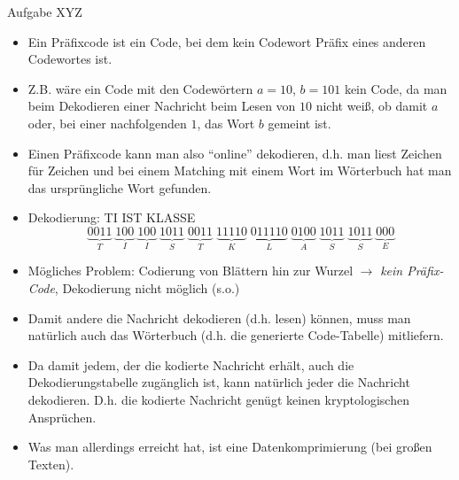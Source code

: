 \begin{frame}[allowframebreaks]{Aufgabe \thesection}{XYZ}
  \begin{Sidenote}
    \begin{itemize}
      \item Ein Präfixcode ist ein Code, bei dem kein Codewort Präfix eines anderen Codewortes ist. 
      \item Z.B. wäre ein Code mit den Codewörtern $a = 10$, $b = 101$ kein Code, da man beim Dekodieren einer Nachricht beim
      Lesen von $10$ nicht weiß, ob damit $a$ oder, bei einer nachfolgenden $1$, das Wort $b$ gemeint ist. 
      \item Einen Präfixcode kann man also \enquote{online} dekodieren, d.h. man liest Zeichen für Zeichen und bei einem Matching mit einem Wort im Wörterbuch hat man das ursprüngliche Wort gefunden.
    \end{itemize}
  \end{Sidenote}
  \begin{solution}
    \begin{itemize}
      \item \alert{Dekodierung:} TI IST KLASSE
        \[
          \underbrace{0011}_{T}\;\underbrace{100}_{I}\;\underbrace{100}_{I}\;\underbrace{1011}_{S}\;\underbrace{0011}_{T}\;\underbrace{11110}_{K}\;\underbrace{011110}_{L}\;\underbrace{0100}_{A}\;\underbrace{1011}_{S}\;\underbrace{1011}_{S}\;\underbrace{000}_{E}
        \]
      \item \alert{Mögliches Problem:} Codierung von Blättern hin zur Wurzel $\rightarrow$ \textit{kein Präfix-Code}, Dekodierung nicht möglich (s.o.)
    \end{itemize}
  \end{solution}
  \begin{solution}
    \begin{itemize}
      \item Damit andere die Nachricht dekodieren (d.h. lesen) können, muss man natürlich auch das Wörterbuch (d.h. die generierte Code-Tabelle) mitliefern. 
      \item Da damit jedem, der die kodierte Nachricht erhält, auch die Dekodierungstabelle zugänglich ist, kann natürlich jeder die Nachricht dekodieren. D.h. die kodierte Nachricht genügt keinen kryptologischen Ansprüchen. 
      \item Was man allerdings erreicht hat, ist eine Datenkomprimierung (bei großen Texten).
    \end{itemize}
  \end{solution}
\end{frame}
